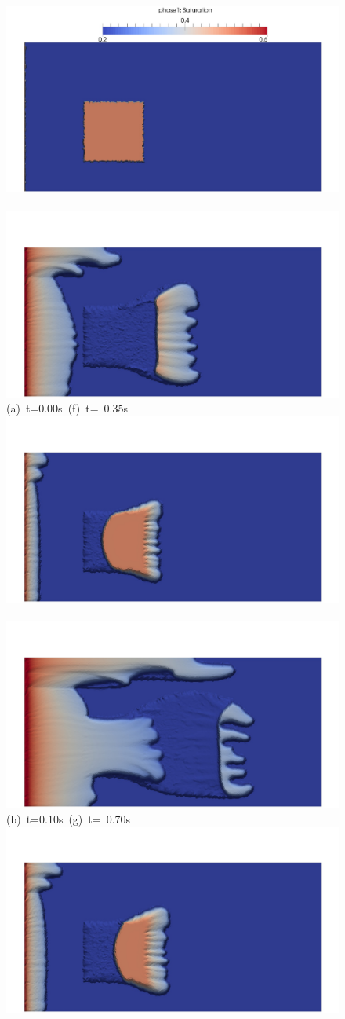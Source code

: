   \begin{figure}[ht]
  \vbox{\vspace{-1.cm}
      \hbox{\includegraphics[width=.45\textwidth]{./Pics1/Section4_4/5r_po_left_inlet_D0b.pdf} 
            \includegraphics[width=.45\textwidth]{./Pics1/Section4_4/5r_po_left_inlet_D350b.pdf}}
      \vspace{-.1cm}\hbox{\hspace{2.cm}(a) t=0.00s \hspace{4cm} (f) t= 0.35s}\vspace{-.1cm}
      \hbox{\includegraphics[width=.45\textwidth]{./Pics1/Section4_4/5r_po_left_inlet_D100b.pdf} 
            \includegraphics[width=.45\textwidth]{./Pics1/Section4_4/5r_po_left_inlet_D700b.pdf}}
      \vspace{-.1cm}\hbox{\hspace{2.cm}(b) t=0.10s \hspace{4cm} (g) t= 0.70s}\vspace{-.1cm}
      \hbox{\includegraphics[width=.45\textwidth]{./Pics1/Section4_4/5r_po_left_inlet_D150b.pdf} 
}}
\end{figure}
